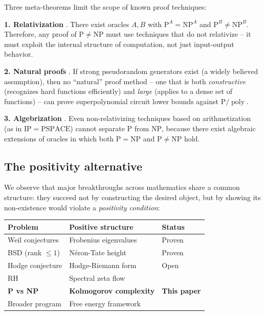 \documentclass[aps,prd,twocolumn,superscriptaddress,nofootinbib]{revtex4-2}
\theoremstyle{definition}
\theoremstyle{remark}
\DeclareMathOperator{\poly}{poly}
\newcommand{\NP}{\mathrm{NP}}
\newcommand{\PP}{\mathrm{P}}
\begin{document}
Three meta-theorems limit the scope of known proof techniques:

\textbf{1. Relativization} \cite{BakerGillSolovay1975}. There exist oracles $A, B$ with $\PP^A = \NP^A$ and $\PP^B \neq \NP^B$. Therefore, any proof of $\PP \neq \NP$ must use techniques that do not relativize -- it must exploit the internal structure of computation, not just input-output behavior.

\textbf{2. Natural proofs} \cite{RazborovRudich1997}. If strong pseudorandom generators exist (a widely believed assumption), then no ``natural'' proof method -- one that is both \textit{constructive} (recognizes hard functions efficiently) and \textit{large} (applies to a dense set of functions) -- can prove superpolynomial circuit lower bounds against $\PP/\poly$.

\textbf{3. Algebrization} \cite{AaronsonWigderson2009}. Even non-relativizing techniques based on arithmetization (as in $\mathrm{IP} = \mathrm{PSPACE}$) cannot separate $\PP$ from $\NP$, because there exist algebraic extensions of oracles in which both $\PP = \NP$ and $\PP \neq \NP$ hold.

\subsection{The positivity alternative}

We observe that major breakthroughs across mathematics share a common structure: they succeed not by constructing the desired object, but by showing its non-existence would violate a \textit{positivity condition}:

\begin{center}
\begin{tabular}{lll}
\hline
Problem & Positive structure & Status \\
\hline
Weil conjectures & Frobenius eigenvalues & Proven \\
BSD (rank $\leq 1$) & N\'eron-Tate height & Proven \\
Hodge conjecture & Hodge-Riemann form & Open \\
RH & Spectral zeta flow & \cite{GeigerRH2026c} \\
\textbf{P vs NP} & \textbf{Kolmogorov complexity} & \textbf{This paper} \\
Broader program & Free energy framework & \cite{FST-Unified2026} \\
\hline
\end{tabular}
\end{center}
\end{document}
